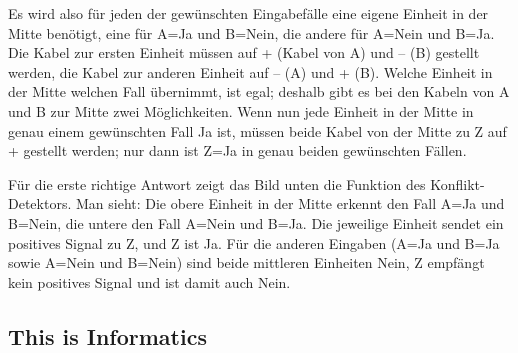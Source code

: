 \documentclass[a4paper,11pt]{report}
\newcommand{\taskGraphicsFolder}{..}
\begin{document}
{\centering%
\par}

Es wird also für jeden der gewünschten Eingabefälle eine eigene Einheit in der Mitte benötigt, eine für A=Ja und B=Nein, die andere für A=Nein und B=Ja.  Die Kabel zur ersten Einheit müssen auf + (Kabel von A) und – (B) gestellt werden, die Kabel zur anderen Einheit auf – (A) und + (B).  Welche Einheit in der Mitte welchen Fall übernimmt, ist egal; deshalb gibt es bei den Kabeln von A und B zur Mitte zwei Möglichkeiten.  Wenn nun jede Einheit in der Mitte in genau einem gewünschten Fall Ja ist, müssen beide Kabel von der Mitte zu Z auf + gestellt werden; nur dann ist Z=Ja in genau beiden gewünschten Fällen.

Für die erste richtige Antwort zeigt das Bild unten die Funktion des Konflikt-Detektors. Man sieht: Die obere Einheit in der Mitte erkennt den Fall A=Ja und B=Nein, die untere den Fall A=Nein und B=Ja. Die jeweilige Einheit sendet ein positives Signal zu Z, und Z ist Ja. Für die anderen Eingaben (A=Ja und B=Ja sowie A=Nein und B=Nein) sind beide mittleren Einheiten Nein, Z empfängt kein positives Signal und ist damit auch Nein.

{\centering%
\raisebox{-0.5ex}{} \raisebox{-0.5ex}{}

\raisebox{-0.5ex}{} \raisebox{-0.5ex}{}\par}


\subsection*{This is Informatics}
\end{document}

